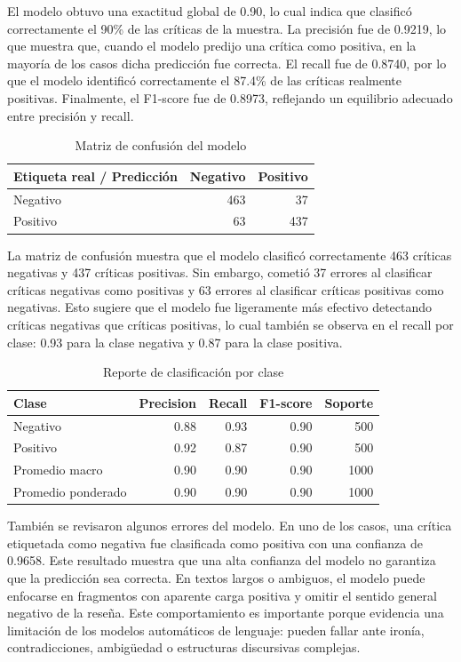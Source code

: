 \documentclass[11pt,letterpaper]{article}
\begin{document}
	El modelo obtuvo una exactitud global de 0.90, lo cual indica que clasificó correctamente el 90\% de las críticas de la muestra. La precisión fue de 0.9219, lo que muestra que, cuando el modelo predijo una crítica como positiva, en la mayoría de los casos dicha predicción fue correcta. El recall fue de 0.8740, por lo que el modelo identificó correctamente el 87.4\% de las críticas realmente positivas. Finalmente, el F1-score fue de 0.8973, reflejando un equilibrio adecuado entre precisión y recall.
	
	\begin{table}[H]
		\centering
		\caption{Matriz de confusión del modelo}
		\label{tab:matriz-confusion}
		\begin{tabular}{lrr}
			\toprule
			Etiqueta real / Predicción & Negativo & Positivo \\
			\midrule
			Negativo & 463 & 37 \\
			Positivo & 63 & 437 \\
			\bottomrule
		\end{tabular}
	\end{table}
	
	La matriz de confusión muestra que el modelo clasificó correctamente 463 críticas negativas y 437 críticas positivas. Sin embargo, cometió 37 errores al clasificar críticas negativas como positivas y 63 errores al clasificar críticas positivas como negativas. Esto sugiere que el modelo fue ligeramente más efectivo detectando críticas negativas que críticas positivas, lo cual también se observa en el recall por clase: 0.93 para la clase negativa y 0.87 para la clase positiva.
	
	\begin{table}[H]
		\centering
		\caption{Reporte de clasificación por clase}
		\label{tab:classification-report}
		\begin{tabular}{lrrrr}
			\toprule
			Clase & Precision & Recall & F1-score & Soporte \\
			\midrule
			Negativo & 0.88 & 0.93 & 0.90 & 500 \\
			Positivo & 0.92 & 0.87 & 0.90 & 500 \\
			\midrule
			Promedio macro & 0.90 & 0.90 & 0.90 & 1000 \\
			Promedio ponderado & 0.90 & 0.90 & 0.90 & 1000 \\
			\bottomrule
		\end{tabular}
	\end{table}
	
	También se revisaron algunos errores del modelo. En uno de los casos, una crítica etiquetada como negativa fue clasificada como positiva con una confianza de 0.9658. Este resultado muestra que una alta confianza del modelo no garantiza que la predicción sea correcta. En textos largos o ambiguos, el modelo puede enfocarse en fragmentos con aparente carga positiva y omitir el sentido general negativo de la reseña. Este comportamiento es importante porque evidencia una limitación de los modelos automáticos de lenguaje: pueden fallar ante ironía, contradicciones, ambigüedad o estructuras discursivas complejas.
	
\end{document}
